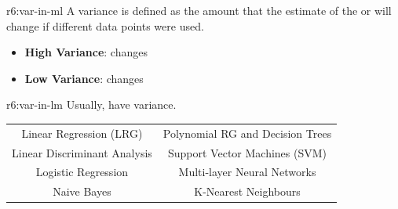 \documentclass{tron}
\begin{document}
\begin{remark}{r6:var-in-ml}
	A variance is defined as the amount that the estimate of the  or  will change if different data points were used.
	
	\begin{itemize}
		\item \textbf{High Variance}:  changes
		\item \textbf{Low Variance}:  changes
	\end{itemize}
\end{remark}

\begin{remark}{r6:var-in-lm}
	Usually,  have  variance.
	
	\begin{center}
		\begin{tabular}{| c || c |} 
			\hline
		 	\blue{Low Variance} & \red{High Variance} \\ 
		 	\hline\hline
		 	Linear Regression (LRG) 			& Polynomial RG and Decision Trees		\\
		 	Linear Discriminant Analysis 	& Support Vector Machines (\Gls{SVM})	\\
		 	Logistic Regression 				& Multi-layer Neural Networks			\\
		 	Naive Bayes						& K-Nearest Neighbours					\\
			\hline\hline
		\end{tabular}
	\end{center}
\end{remark}
\end{document}
